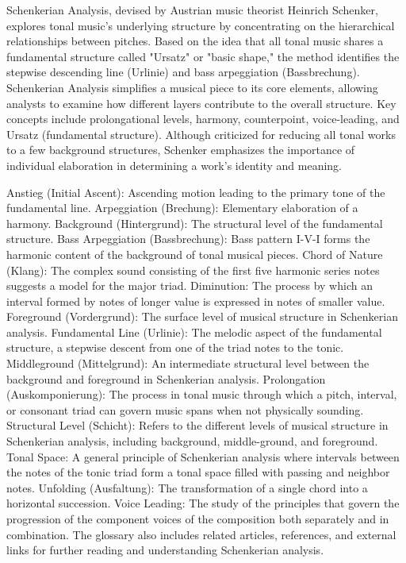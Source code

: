 
Schenkerian Analysis, devised by Austrian music theorist Heinrich Schenker, explores tonal music's underlying structure by concentrating on the hierarchical relationships between pitches. Based on the idea that all tonal music shares a fundamental structure called "Ursatz" or "basic shape," the method identifies the stepwise descending line (Urlinie) and bass arpeggiation (Bassbrechung). Schenkerian Analysis simplifies a musical piece to its core elements, allowing analysts to examine how different layers contribute to the overall structure. Key concepts include prolongational levels, harmony, counterpoint, voice-leading, and Ursatz (fundamental structure). Although criticized for reducing all tonal works to a few background structures, Schenker emphasizes the importance of individual elaboration in determining a work's identity and meaning.


Anstieg (Initial Ascent): Ascending motion leading to the primary tone of the fundamental line.
Arpeggiation (Brechung): Elementary elaboration of a harmony.
Background (Hintergrund): The structural level of the fundamental structure.
Bass Arpeggiation (Bassbrechung): Bass pattern I-V-I forms the harmonic content of the background of tonal musical pieces.
Chord of Nature (Klang): The complex sound consisting of the first five harmonic series notes suggests a model for the major triad.
Diminution: The process by which an interval formed by notes of longer value is expressed in notes of smaller value.
Foreground (Vordergrund): The surface level of musical structure in Schenkerian analysis.
Fundamental Line (Urlinie): The melodic aspect of the fundamental structure, a stepwise descent from one of the triad notes to the tonic.
Middleground (Mittelgrund): An intermediate structural level between the background and foreground in Schenkerian analysis.
Prolongation (Auskomponierung): The process in tonal music through which a pitch, interval, or consonant triad can govern music spans when not physically sounding.
Structural Level (Schicht): Refers to the different levels of musical structure in Schenkerian analysis, including background, middle-ground, and foreground.
Tonal Space: A general principle of Schenkerian analysis where intervals between the notes of the tonic triad form a tonal space filled with passing and neighbor notes.
Unfolding (Ausfaltung): The transformation of a single chord into a horizontal succession.
Voice Leading: The study of the principles that govern the progression of the component voices of the composition both separately and in combination.
The glossary also includes related articles, references, and external links for further reading and understanding Schenkerian analysis.



